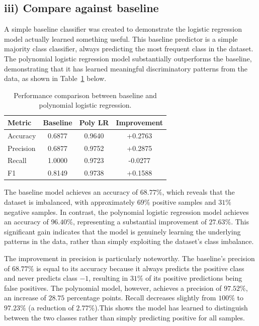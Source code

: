 \subsection{iii) Compare against baseline}

A simple baseline classifier was created to demonstrate the logistic regression model actually learned something useful. This baseline predictor is a simple majority class classifier, always predicting the most frequent class in the dataset. The polynomial logistic regression model substantially outperforms the baseline, demonstrating that it has learned meaningful discriminatory patterns from the data, as shown in Table~\ref{tab:performance_comparison} below.

\begin{table}[H]
    \centering
    \begin{tabular}{lccc}
        \toprule
        \textbf{Metric} & \textbf{Baseline} & \textbf{Poly LR} & \textbf{Improvement} \\
        \midrule
        Accuracy  & 0.6877 & 0.9640 & +0.2763 \\
        Precision & 0.6877 & 0.9752 & +0.2875 \\
        Recall    & 1.0000 & 0.9723 & -0.0277 \\
        F1        & 0.8149 & 0.9738 & +0.1588 \\
        \bottomrule
    \end{tabular}
    \caption{Performance comparison between baseline and polynomial logistic regression.}
    \label{tab:performance_comparison}
\end{table}


The baseline model achieves an accuracy of $68.77\%$, which reveals that the dataset is imbalanced, with approximately $69\%$ positive samples and $31\%$ negative samples. In contrast, the polynomial logistic regression model achieves an accuracy of $96.40\%$, representing a substantial improvement of $27.63\%$. This significant gain indicates that the model is genuinely learning the underlying patterns in the data, rather than simply exploiting the dataset's class imbalance.

The improvement in precision is particularly noteworthy. The baseline's precision of $68.77\%$ is equal to its accuracy because it always predicts the positive class and never predicts class $-1$, resulting in $31\%$ of its positive predictions being false positives. The polynomial model, however, achieves a precision of $97.52\%$, an increase of $28.75$ percentage points. Recall decreases slightly from $100\%$ to $97.23\%$ (a reduction of $2.77\%$).This shows the model has learned to distinguish between the two classes rather than simply predicting positive for all samples.

